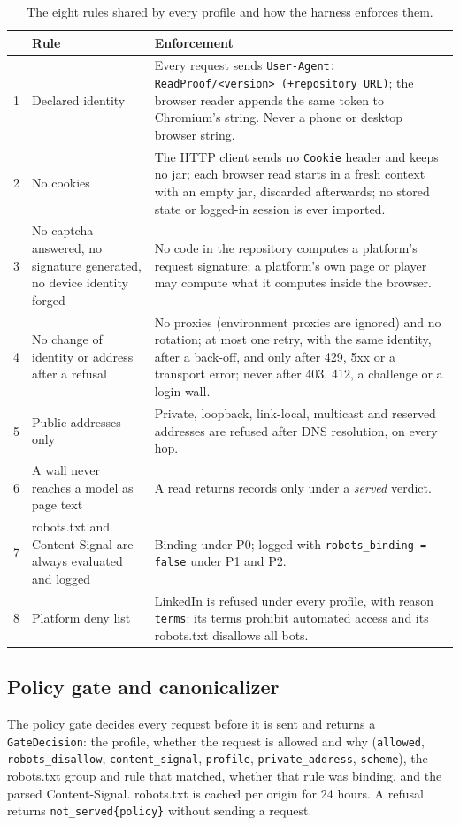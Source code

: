 \documentclass[11pt]{article}
\newcommand{\wt}[1]{\texttt{#1}}%
\begin{document}
\begin{table}[t]
\centering\small
\caption{The eight rules shared by every profile and how the harness enforces them.}
\label{tab:rules}
\begin{tabular}{@{}r p{5.2cm} p{8.6cm}@{}}
\toprule
& Rule & Enforcement \\
\midrule
1 & Declared identity & Every request sends \texttt{User-Agent: ReadProof/<version> (+repository URL)}; the
  browser reader appends the same token to Chromium's string. Never a phone or desktop browser string. \\
2 & No cookies & The HTTP client sends no \texttt{Cookie} header and keeps no jar; each browser read starts
  in a fresh context with an empty jar, discarded afterwards; no stored state or logged-in session is ever
  imported. \\
3 & No captcha answered, no signature generated, no device identity forged & No code in the repository
  computes a platform's request signature; a platform's own page or player may compute what it computes
  inside the browser. \\
4 & No change of identity or address after a refusal & No proxies (environment proxies are ignored) and no
  rotation; at most one retry, with the same identity, after a back-off, and only after 429, 5xx or a
  transport error; never after 403, 412, a challenge or a login wall. \\
5 & Public addresses only & Private, loopback, link-local, multicast and reserved addresses are refused after
  DNS resolution, on every hop. \\
6 & A wall never reaches a model as page text & A read returns records only under a \emph{served} verdict. \\
7 & robots.txt and Content-Signal are always evaluated and logged & Binding under P0; logged with
  \texttt{robots\_binding = false} under P1 and P2. \\
8 & Platform deny list & LinkedIn is refused under every profile, with reason \texttt{terms}: its terms
  prohibit automated access and its robots.txt disallows all bots. \\
\bottomrule
\end{tabular}
\end{table}

\subsection{Policy gate and canonicalizer}
The policy gate decides every request before it is sent and returns a \texttt{GateDecision}: the profile,
whether the request is allowed and why (\texttt{allowed}, \texttt{robots\_disallow}, \texttt{content\_signal},
\texttt{profile}, \texttt{private\_address}, \texttt{scheme}), the robots.txt group and rule that matched,
whether that rule was binding, and the parsed Content-Signal. robots.txt is cached per origin for 24 hours.
A refusal returns \wt{not\_served\{policy\}} without sending a request.
\end{document}
